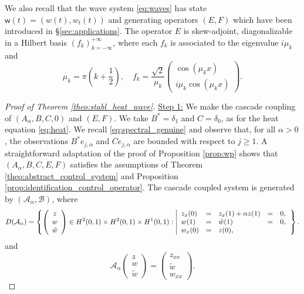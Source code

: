 \documentclass[10pt]{article}
\begin{document}
We also recall that the wave system \eqref{eq:waves} has state $\mathsf{w}(t) = (w(t),w_t(t))$ and generating operators $(E,F)$ which have been introduced in \S \ref{sec:applications}. The operator $E$ is skew-adjoint, diagonalizable in a Hilbert basis $(f_k)_{k=-\infty}^{+\infty}$, where each $f_k$ is associated to the eigenvalue $i \mu_k$ and
\[
\mu_k = \pi \left( k + \frac{1}{2} \right),\quad f_k = \frac{\sqrt{2}}{\mu_k} \left( 
\begin{array}{c}
    \cos(\mu_k x) \\
   i \mu_k \cos(\mu_k x)
\end{array}
\right).
\]
\begin{proof}[Proof of Theorem \ref{theo:stabl_heat_wave}] \underline{Step 1:} We make the cascade coupling of $(A_\alpha, B, C,0)$ and $(E,F)$. 
\newline
\newline
We take $B^* = \delta_1$ and $C = \delta_0$, as for the heat equation \eqref{eq:heat}. We recall \eqref{eq:spectral_genuine} and observe that, for all $\alpha > 0$, the observations $B^*e_{j,\alpha}$ and $Ce_{j,\alpha}$ are bounded with respect to $j \geq 1$. A straightforward adaptation of the proof of Proposition \ref{prop:wp} shows that $(A_\alpha, B,C,E,F)$ satisfies the assumptions of Theorem \ref{theo:abstract_control_system} and Proposition \ref{prop:identification_control_operator}. The cascade coupled system is generated by $(\mathcal{A}_\alpha,\mathcal{B})$, where 
\[
D(\mathcal{A}_\alpha) =  \left\lbrace \left( \begin{array}{c}
z \\ w \\ \tilde w
\end{array} \right) \in H^2(0,1) \times H^2(0,1) \times H^1(0,1) : \left\vert \begin{array}{lll cc}
z_x(0) &=& z_x(1) + \alpha z(1) &=& 0, \\
w(1) &=&\tilde w(1) &=&0, \\
w_x(0) &=& z(0),
\end{array}\right. \right\rbrace.
\]
and
\[
\mathcal{A}_\alpha\left( \begin{array}{c}
z \\
w \\
\tilde{w}
\end{array} \right) = \left( \begin{array}{c}
z_{xx} \\
\tilde{w} \\
w_{xx}
\end{array} \right).
\]
\end{proof}
\end{document}
